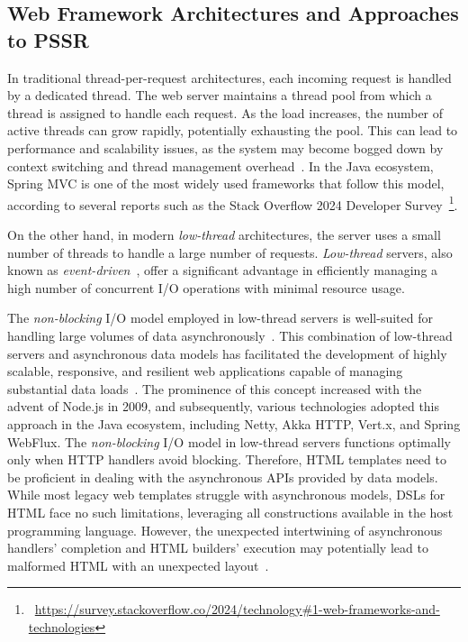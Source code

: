 \subsection{Web Framework Architectures and Approaches to PSSR}
\label{sec:web-frameworks}

In traditional thread-per-request architectures, each incoming request is
handled by a dedicated thread. The web server maintains a thread pool from
which a thread is assigned to handle each request. As the load increases, the
number of active threads can grow rapidly, potentially exhausting the pool.
This can lead to performance and scalability issues, as the system may become
bogged down by context switching and thread management
overhead~\cite{kant2000scalable}. In the Java ecosystem, Spring MVC is one of
the most widely used frameworks that follow this model, according to several
reports such as the Stack Overflow 2024 Developer
Survey~\footnote{~\url{https://survey.stackoverflow.co/2024/technology\#1-web-frameworks-and-technologies}}.

On the other hand, in modern \textit{low-thread} architectures, the server uses
a small number of threads to handle a large number of requests.
\textit{Low-thread} servers, also known as
\textit{event-driven}~\cite{event-driven-servers}, offer a significant
advantage in efficiently managing a high number of concurrent I/O operations
with minimal resource usage.

The \textit{non-blocking} I/O model employed in low-thread servers is
well-suited for handling large volumes of data asynchronously~\cite{Meijer12}.
This combination of low-thread servers and asynchronous data models has
facilitated the development of highly scalable, responsive, and resilient web
applications capable of managing substantial data loads~\cite{Jin15}. The
prominence of this concept increased with the advent of Node.js in 2009, and
subsequently, various technologies adopted this approach in the Java ecosystem,
including Netty, Akka HTTP, Vert.x, and Spring WebFlux.
The \textit{non-blocking} I/O model in low-thread servers functions optimally
only when HTTP handlers avoid blocking. Therefore, HTML templates need to be
proficient in dealing with the asynchronous APIs provided by data models. While
most legacy web templates struggle with asynchronous models, DSLs for HTML face
no such limitations, leveraging all constructions available in the host
programming language. However, the unexpected intertwining of asynchronous
handlers' completion and HTML builders' execution may potentially lead to
malformed HTML with an unexpected layout~\cite{wise2024pssr}.

